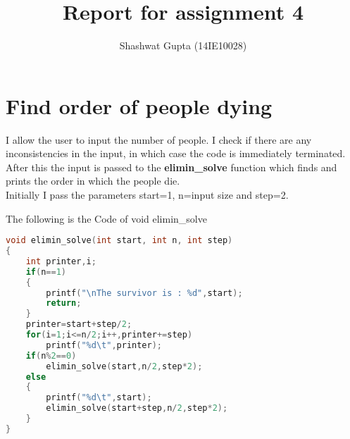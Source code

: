 \documentclass{article}
\title{Report for assignment 4}
\author{Shashwat Gupta (14IE10028)}
\begin{document}
\maketitle

\section{Find order of people dying}

I allow the user to input the number of people. I check if there are any inconsistencies in the input, in which case the code is immediately terminated. After this the input is passed to the \textbf{elimin\_solve} function which finds and prints the order in which the people die. \\
Initially I pass the parameters start=1, n=input size and step=2.

The following is the Code of void elimin\_solve
\begin{lstlisting}[language=c, caption=elimin\_solve]
void elimin_solve(int start, int n, int step)
{
    int printer,i;
    if(n==1)
    {
        printf("\nThe survivor is : %d",start);
        return;
    }
    printer=start+step/2;
    for(i=1;i<=n/2;i++,printer+=step)
        printf("%d\t",printer);
    if(n%2==0)
        elimin_solve(start,n/2,step*2);
    else
    {
        printf("%d\t",start);
        elimin_solve(start+step,n/2,step*2);
    }
}
\end{lstlisting}
\end{document}
